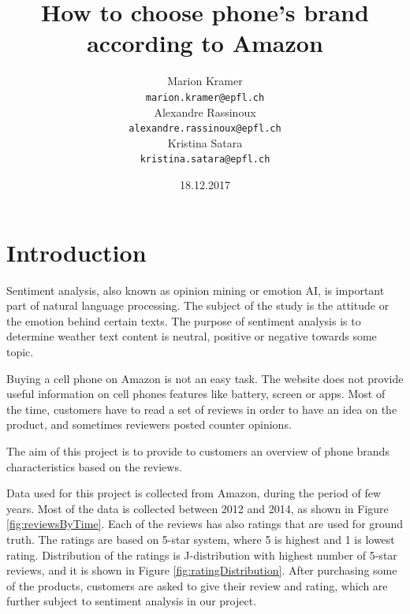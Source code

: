 \documentclass[11pt]{article}
\title{How to choose phone's brand according to Amazon}
\author{Marion Kramer\\
    {\tt marion.kramer@epfl.ch} \\\And
    Alexandre Rassinoux \\
    {\tt alexandre.rassinoux@epfl.ch} \\\And
  Kristina Satara \\
  {\tt kristina.satara@epfl.ch} \\}
\date{18.12.2017}
\begin{document}
  \maketitle
  \begin{abstract}
  \end{abstract}
  
  
  \section{Introduction}
  Sentiment analysis, also known as opinion mining or emotion AI, is important part of natural language processing. The subject of the study is the attitude or the emotion behind certain texts. The purpose of sentiment analysis is to determine weather text content is neutral, positive or negative towards some topic. 
  
  \par Buying a cell phone on Amazon is not an easy task. The website does not provide useful information on cell phones features like battery, screen or apps. Most of the time, customers have to read a set of reviews in order to have an idea on the product, and sometimes reviewers posted counter opinions. 
  \par The aim of this project is to provide to customers an overview of phone brands characteristics based on the reviews. 
  
  Data used for this project is collected from Amazon, during the period of few years. Most of the data is collected between 2012 and 2014, as shown in Figure \ref{fig:reviewsByTime}. Each of the reviews has also ratings that are used for ground truth. The ratings are based on 5-star system, where 5 is highest and 1 is lowest rating. Distribution of the ratings is J-distribution with highest number of 5-star reviews, and it is shown in Figure \ref{fig:ratingDistribution}. After purchasing some of the products, customers are asked to give their review and rating, which are further subject to sentiment analysis in our project. 
  
\end{document}
